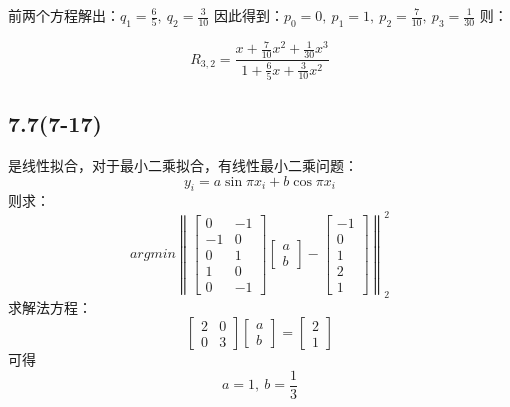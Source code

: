 \documentclass[UTF8,zihao=5]{ctexart}
\begin{document}
前两个方程解出：$q_1=\frac{6}{5},\ q_2=\frac{3}{10}$
因此得到：$p_0=0,\ p_1=1,\ p_2=\frac{7}{10},\ p_3=\frac{1}{30}$
则：

$$
    R_{3,2}=\frac{x+\frac{7}{10}x^2+\frac{1}{30}x^3}
    {1+\frac{6}{5}x+\frac{3}{10}x^2}
$$

\subsection*{7.7(7-17)}

是线性拟合，对于最小二乘拟合，有线性最小二乘问题：
$$
    y_i=a\sin{\pi x_i}+b\cos{\pi x_i}
$$
则求：
$$
    argmin\left\|\begin{bmatrix}
        0  & -1 \\
        -1 & 0  \\
        0  & 1  \\
        1  & 0  \\
        0  & -1
    \end{bmatrix}\begin{bmatrix}
        a \\
        b
    \end{bmatrix}-\begin{bmatrix}
        -1 \\0\\1\\2\\1
    \end{bmatrix}
    \right\|_2^2
$$
求解法方程：
$$
    \begin{bmatrix}
        2 & 0 \\ 0& 3
    \end{bmatrix}
    \begin{bmatrix}
        a \\
        b
    \end{bmatrix}=\begin{bmatrix}
        2\\1
    \end{bmatrix}
$$
可得
$$
a=1,\ b=\frac{1}{3}
$$
 
\end{document}
